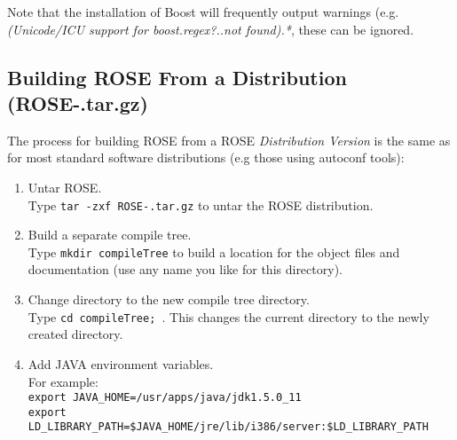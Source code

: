   Note that the installation of Boost will frequently output 
warnings (e.g. {\em *(Unicode/ICU support for boost.regex?..not found).*},
these can be ignored.

\subsection{Building ROSE From a Distribution (ROSE-\VersionNumber.tar.gz)}
\label{gettingStarted:UserInstructions}
   The process for building ROSE from a ROSE {\em Distribution Version} is the same as for
    most standard software distributions (e.g those using autoconf tools):
\begin{enumerate}
     \item Untar ROSE. \\
           Type {\tt tar -zxf ROSE-\VersionNumber.tar.gz} to untar the ROSE distribution.
     \item Build a separate compile tree. \\
           Type {\tt mkdir compileTree} to build a location for the object files and
           documentation (use any name you like for this directory).
     \item Change directory to the new compile tree directory. \\
           Type {\tt cd compileTree; }. This changes the current directory to the newly
           created directory.
     \item Add JAVA environment variables. \\
           For example:\\
           {\tt export JAVA\_HOME=/usr/apps/java/jdk1.5.0\_11} \\
        {\tt export
        LD\_LIBRARY\_PATH=\$JAVA\_HOME/jre/lib/i386/server:\$LD\_LIBRARY\_PATH}


\end{enumerate}
